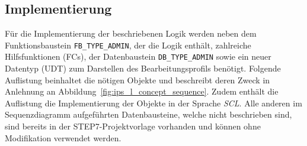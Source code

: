 


\subsection{Implementierung}
\label{subsec:ips_l_implementation}

Für die Implementierung der beschriebenen Logik werden neben dem Funktionsbaustein \texttt{FB\_TYPE\_ADMIN}, der die Logik enthält, zahlreiche Hilfsfunktionen (FCs), der Datenbaustein \texttt{DB\_TYPE\_ADMIN} sowie ein neuer Datentyp (UDT) zum Darstellen des Bearbeitungsprofils benötigt. Folgende Auflistung beinhaltet die nötigen Objekte und beschreibt deren Zweck in Anlehnung an Abbildung~\ref{fig:ips_l_concept_sequence}. Zudem enthält die Auflistung die Implementierung der Objekte in der Sprache \emph{SCL}. Alle anderen im Sequenzdiagramm aufgeführten Datenbausteine, welche nicht beschrieben sind, sind bereits in der STEP7-Projektvorlage vorhanden und können ohne Modifikation verwendet werden. 
\newpage


